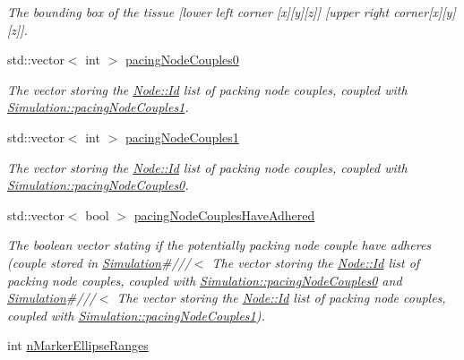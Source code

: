 \begin{DoxyCompactItemize}
\begin{DoxyCompactList}\small\item\em The bounding box of the tissue \mbox{[}lower left corner \mbox{[}x\mbox{]}\mbox{[}y\mbox{]}\mbox{[}z\mbox{]}\mbox{]} \mbox{[}upper right corner\mbox{[}x\mbox{]}\mbox{[}y\mbox{]}\mbox{[}z\mbox{]}\mbox{]}. \end{DoxyCompactList}\item 
\hypertarget{classSimulation_aeb78dddb085445b34d6ed6efee996183}{}std\+::vector$<$ int $>$ \hyperlink{classSimulation_aeb78dddb085445b34d6ed6efee996183}{pacing\+Node\+Couples0}\label{classSimulation_aeb78dddb085445b34d6ed6efee996183}

\begin{DoxyCompactList}\small\item\em The vector storing the \hyperlink{classNode_a1bd379569cc1a8b96432e61971aed4d9}{Node\+::\+Id} list of packing node couples, coupled with \hyperlink{classSimulation_ab67e69811ef54ec761cce2b4c76fb568}{Simulation\+::pacing\+Node\+Couples1}. \end{DoxyCompactList}\item 
\hypertarget{classSimulation_ab67e69811ef54ec761cce2b4c76fb568}{}std\+::vector$<$ int $>$ \hyperlink{classSimulation_ab67e69811ef54ec761cce2b4c76fb568}{pacing\+Node\+Couples1}\label{classSimulation_ab67e69811ef54ec761cce2b4c76fb568}

\begin{DoxyCompactList}\small\item\em The vector storing the \hyperlink{classNode_a1bd379569cc1a8b96432e61971aed4d9}{Node\+::\+Id} list of packing node couples, coupled with \hyperlink{classSimulation_aeb78dddb085445b34d6ed6efee996183}{Simulation\+::pacing\+Node\+Couples0}. \end{DoxyCompactList}\item 
\hypertarget{classSimulation_ad549ce1c8c1fee8311e54eea5dede24d}{}std\+::vector$<$ bool $>$ \hyperlink{classSimulation_ad549ce1c8c1fee8311e54eea5dede24d}{pacing\+Node\+Couples\+Have\+Adhered}\label{classSimulation_ad549ce1c8c1fee8311e54eea5dede24d}

\begin{DoxyCompactList}\small\item\em The boolean vector stating if the potentially packing node couple have adheres (couple stored in \hyperlink{classSimulation}{Simulation}\#///$<$ The vector storing the \hyperlink{classNode_a1bd379569cc1a8b96432e61971aed4d9}{Node\+::\+Id} list of packing node couples, coupled with \hyperlink{classSimulation_aeb78dddb085445b34d6ed6efee996183}{Simulation\+::pacing\+Node\+Couples0} and \hyperlink{classSimulation}{Simulation}\#///$<$ The vector storing the \hyperlink{classNode_a1bd379569cc1a8b96432e61971aed4d9}{Node\+::\+Id} list of packing node couples, coupled with \hyperlink{classSimulation_ab67e69811ef54ec761cce2b4c76fb568}{Simulation\+::pacing\+Node\+Couples1}). \end{DoxyCompactList}\item 
\hypertarget{classSimulation_a6a035fd880a67421014b46a9a85c6cbd}{}int \hyperlink{classSimulation_a6a035fd880a67421014b46a9a85c6cbd}{n\+Marker\+Ellipse\+Ranges}\label{classSimulation_a6a035fd880a67421014b46a9a85c6cbd}


\end{DoxyCompactItemize}
